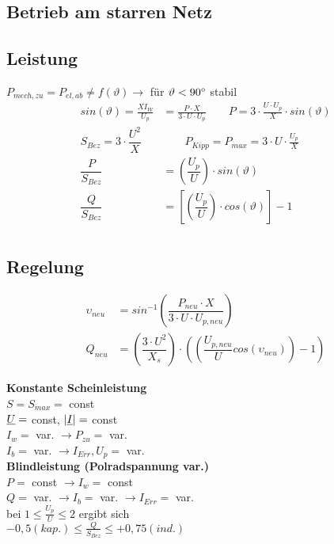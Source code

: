 \subsection{Betrieb am starren Netz}



\subsection{Leistung}
$P_{mech,zu} = P_{el,ab} \neq f(\vartheta) \rightarrow$ für $\vartheta < 90\degree$ stabil\\
\begin{align*}
    sin(\vartheta) = \frac{XI_W}{U_p} &= \frac{P\cdot X}{3\cdot U \cdot U_p}  \qquad P = 3 \cdot \frac{U\cdot U_p}{X} \cdot sin(\vartheta)\\
    S_{Bez} = 3 \cdot \dfrac{U^2}{X} & \qquad P_{Kipp} = P_{max} = 3\cdot U \cdot \frac{U_p}{X}\\
    \dfrac{P}{S_{Bez}} &= \left(\dfrac{U_p}{U}\right) \cdot sin(\vartheta)\\
    \dfrac{Q}{S_{Bez}} &= \left[\left(\dfrac{U_p}{U}\right) \cdot cos(\vartheta)\right] -1\\
\end{align*}

\newpage
\subsection{Regelung}

\begin{align*}
    \upsilon_{neu} &= sin^{-1}\left( \dfrac{P_{neu} \cdot X}{3 \cdot U \cdot U_{p,neu}}\right)\\
    Q_{neu} &= \left( \dfrac{3 \cdot U^2}{X_s}\right) \cdot \left( \left( \dfrac{U_{p,neu}}{U} cos( \upsilon_{neu})\right)-1\right)
\end{align*}

\textbf{Konstante Scheinleistung}\\
\indent $S = S_{max} =$ const\\
\indent $\underline{U}=$ const, $|\underline{I}| =$ const\\
\indent $I_w =$ var. $\rightarrow P_{zu}=$ var.\\
\indent $I_b =$ var. $\rightarrow I_{Err}, U_p =$ var.\\

\textbf{Blindleistung (Polradspannung var.)}\\
\indent $P =$ const $\rightarrow I_w= $ const\\
\indent $Q =$ var. $\rightarrow I_b = $ var. $\rightarrow I_{Err}=$ var.\\
\indent bei $1 \leq \frac{U_p}{U} \leq 2$ ergibt sich \\
\indent $-0,5 (kap.) \leq \frac{Q}{S_{Bez}} \leq +0,75(ind.)$\\


